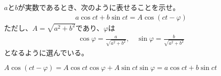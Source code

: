 \begin{renshu}
$a$と$b$が実数であるとき、次のように表せることを示せ。
\begin{align}
a\cos ct + b\sin ct = A\cos(ct-\varphi)
\end{align}
ただし、$A=\sqrt{a^2+b^2}$であり、$\varphi$は
\begin{align}
\cos\varphi=\frac{a}{\sqrt{a^2+b^2}},\quad \sin\varphi=\frac{b}{\sqrt{a^2+b^2}}
\end{align}
となるように選んでいる。
\end{renshu}

\begin{kaitou*}
$A\cos(ct-\varphi)=A\cos ct \cos\varphi + A\sin ct \sin\varphi=a\cos ct + b\sin ct$
\end{kaitou*}